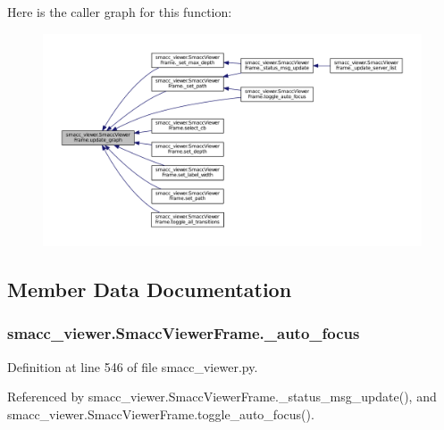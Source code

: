 Here is the caller graph for this function\+:
\nopagebreak
\begin{figure}[H]
\begin{center}
\leavevmode
\includegraphics[width=350pt]{classsmacc__viewer_1_1SmaccViewerFrame_a3dbf56a66153e99b403fe731ea8a6759_icgraph}
\end{center}
\end{figure}




\subsection{Member Data Documentation}
\subsubsection[{\texorpdfstring{\+\_\+auto\+\_\+focus}{_auto_focus}}]{\setlength{\rightskip}{0pt plus 5cm}smacc\+\_\+viewer.\+Smacc\+Viewer\+Frame.\+\_\+auto\+\_\+focus\hspace{0.3cm}{\ttfamily [private]}}\hypertarget{classsmacc__viewer_1_1SmaccViewerFrame_a733f65cc99ce9d6effae5c6a87be4989}{}\label{classsmacc__viewer_1_1SmaccViewerFrame_a733f65cc99ce9d6effae5c6a87be4989}


Definition at line 546 of file smacc\+\_\+viewer.\+py.



Referenced by smacc\+\_\+viewer.\+Smacc\+Viewer\+Frame.\+\_\+status\+\_\+msg\+\_\+update(), and smacc\+\_\+viewer.\+Smacc\+Viewer\+Frame.\+toggle\+\_\+auto\+\_\+focus().

